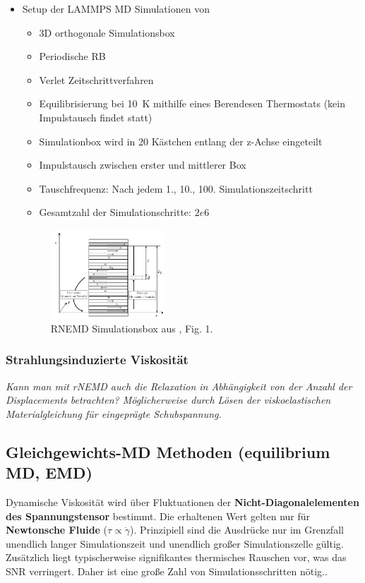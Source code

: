 \documentclass[a4paper, 10pt, 
               numbers=noenddot, toc=graduated,
               headsepline=true, footsepline=true,
               twoside=false, titlepage=true, 
               bibliography=totoc]{scrartcl}
\begin{document}
\begin{itemize}
		 \item Setup der LAMMPS MD Simulationen von \cite{Tenney2010} 
		 		\begin{itemize}
		 			\item 3D orthogonale Simulationsbox
		 			\item Periodische RB
		 			\item Verlet Zeitschrittverfahren
		 			\item Equilibrisierung bei \SI{10}{K} mithilfe eines Berendesen Thermostats (kein Impulstausch findet statt)
		 			\item Simulationbox wird in 20 Kästchen entlang der z-Achse eingeteilt
		 			\item Impulstausch zwischen erster und mittlerer Box
		 			\item Tauschfrequenz: Nach jedem 1., 10., 100. Simulationszeitschritt
		 			\item Gesamtzahl der Simulationschritte: $2e6$
		 		\end{itemize}
		 	
		 
		 
		\begin{figure}[H]
	    	\includegraphics[width=0.4\textwidth]{figs/rnemd_box}%
	    	\caption{RNEMD Simulationsbox aus \cite{Tenney2010}, Fig. 1.}
   		\end{figure}		 
		 
	\end{itemize}
	
	\subsubsection{Strahlungsinduzierte Viskosität}
	
	\textit{Kann man mit rNEMD auch die Relaxation in Abhängigkeit von der Anzahl der Displacements betrachten? Möglicherweise durch Lösen der viskoelastischen Materialgleichung für eingeprägte Schubspannung.}



\subsection{Gleichgewichts-MD Methoden (equilibrium MD, EMD)}
Dynamische Viskosität wird über Fluktuationen der \textbf{Nicht-Diagonalelementen des Spannungstensor} bestimmt. Die erhaltenen Wert gelten nur für \textbf{Newtonsche Fluide} ($\tau \propto \dot{\gamma}$). Prinzipiell sind die Ausdrücke nur im Grenzfall unendlich langer Simulationszeit und unendlich großer Simulationszelle gültig. Zusätzlich liegt typischerweise signifikantes thermisches Rauschen vor, was das SNR verringert. Daher ist eine große Zahl von Simulationsschritten nötig.\cite{Tenney2010}.
\end{document}
